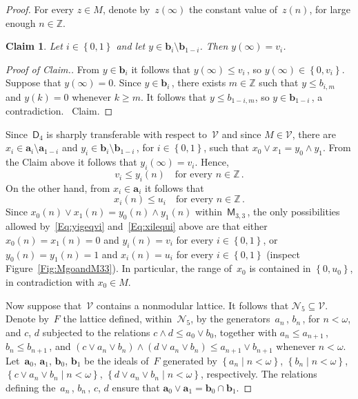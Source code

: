\documentclass[reqno]{amsart}
\numberwithin{equation}{section}
\theoremstyle{plain}
\newtheorem*{sclaim}{Claim}
\theoremstyle{definition}
\theoremstyle{remark}
\newenvironment{scproof}
{\begin{proof}[Proof of Claim.]}
{{{}~{\rm Claim.}}\end{proof}}
\numberwithin{figure}{section}
\numberwithin{table}{section}
\begin{document}
\begin{proof}
For every $z\in M$, denote by~$z(\infty)$ the constant value of~$z(n)$, for large enough $n\in{\mathbb{Z}}$.

\begin{sclaim}
Let $i\in{\left\{{0,1}\right\}}$ and let $y\in{\boldsymbol{b}}_i\setminus{\boldsymbol{b}}_{1-i}$.
Then $y(\infty)=v_i$.
\end{sclaim}

\begin{scproof}
{}From $y\in{\boldsymbol{b}}_i$ it follows that $y(\infty)\leq v_i$\,, so $y(\infty)\in{\left\{{0,v_i}\right\}}$.
Suppose that $y(\infty)=0$.
Since $y\in{\boldsymbol{b}}_i$\,, there exists $m\in{\mathbb{Z}}$ such that $y\leq b_{i,m}$ and $y(k)=0$ whenever $k\geq m$.
It follows that $y\leq b_{1-i,m}$, so $y\in{\boldsymbol{b}}_{1-i}$\,, a contradiction.
\end{scproof}

Since~${\mathsf{D}_{4}}$ is sharply transferable with respect to~${\mathcal{V}}$ and since $M\in{\mathcal{V}}$, there are $x_i\in{\boldsymbol{a}}_i\setminus{\boldsymbol{a}}_{1-i}$ and $y_i\in{\boldsymbol{b}}_i\setminus{\boldsymbol{b}}_{1-i}$\,, for $i\in{\left\{{0,1}\right\}}$, such that $x_0\vee x_1=y_0\wedge y_1$.
{}From the Claim above it follows that $y_i(\infty)=v_i$.
Hence,
 \begin{equation}\label{Eq:yigeqvi}
 v_i\leq y_i(n)\quad\text{for every }n\in{\mathbb{Z}}\,.
 \end{equation}
On the other hand, from $x_i\in{\boldsymbol{a}}_i$ it follows that
 \begin{equation}\label{Eq:xilequi}
 x_i(n)\leq u_i\quad\text{for every }n\in{\mathbb{Z}}\,.
 \end{equation}
Since $x_0(n)\vee x_1(n)=y_0(n)\wedge y_1(n)$ within~${{\mathsf{M}}}_{3,3}$\,, the only possibilities allowed by~\eqref{Eq:yigeqvi} and~\eqref{Eq:xilequi} above are that either $x_0(n)=x_1(n)=0$ and $y_i(n)=v_i$ for every $i\in{\left\{{0,1}\right\}}$, or $y_0(n)=y_1(n)=1$ and $x_i(n)=u_i$ for every $i\in{\left\{{0,1}\right\}}$ (inspect Figure~\ref{Fig:MgoandM33}).
In particular, the range of~$x_0$ is contained in ${\left\{{0,u_0}\right\}}$, in contradiction with $x_0\in M$.

Now suppose that~${\mathcal{V}}$ contains a nonmodular lattice.
It follows that ${\mathcal{N}}_5\subseteq{\mathcal{V}}$.
Denote by~$F$ the lattice defined, within~${\mathcal{N}}_5$, by the generators~$a_n$\,, $b_n$\,, for $n<{\omega}$, and $c$, $d$ subjected to the relations $c\wedge d\leq a_0\vee b_0$, together with $a_n\leq a_{n+1}$\,, $b_n\leq b_{n+1}$\,, and $(c\vee a_n\vee b_n)\wedge(d\vee a_n\vee b_n)\leq a_{n+1}\vee b_{n+1}$ whenever $n<{\omega}$.
Let~${\boldsymbol{a}}_0$, ${\boldsymbol{a}}_1$, ${\boldsymbol{b}}_0$, ${\boldsymbol{b}}_1$ be the ideals of~$F$ generated by ${{\left\{{{{a_n}}\mid{{n<{\omega}}}}\right\}}}$, ${{\left\{{{{b_n}}\mid{{n<{\omega}}}}\right\}}}$, ${{\left\{{{{c\vee a_n\vee b_n}}\mid{{n<{\omega}}}}\right\}}}$, ${{\left\{{{{d\vee a_n\vee b_n}}\mid{{n<{\omega}}}}\right\}}}$, respectively.
The relations defining the~$a_n$\,, $b_n$\,, $c$, $d$ ensure that ${\boldsymbol{a}}_0\vee{\boldsymbol{a}}_1={\boldsymbol{b}}_0\cap{\boldsymbol{b}}_1$.


\end{proof}
\end{document}
